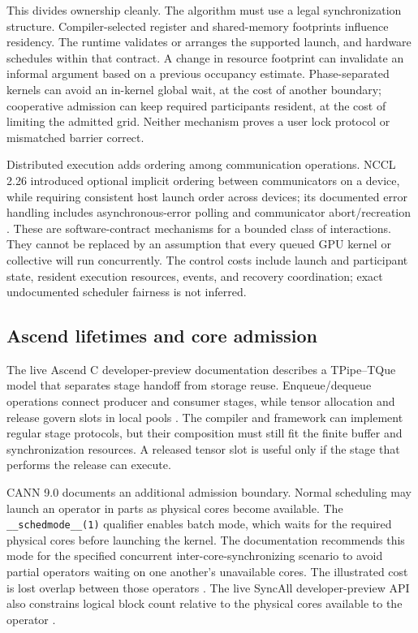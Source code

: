 This divides ownership cleanly. The algorithm must use a legal synchronization structure. Compiler-selected register and shared-memory footprints influence residency. The runtime validates or arranges the supported launch, and hardware schedules within that contract. A change in resource footprint can invalidate an informal argument based on a previous occupancy estimate. Phase-separated kernels can avoid an in-kernel global wait, at the cost of another boundary; cooperative admission can keep required participants resident, at the cost of limiting the admitted grid. Neither mechanism proves a user lock protocol or mismatched barrier correct.

Distributed execution adds ordering among communication operations. NCCL 2.26 introduced optional implicit ordering between communicators on a device, while requiring consistent host launch order across devices; its documented error handling includes asynchronous-error polling and communicator abort/recreation \citep{u008_nccl}. These are software-contract mechanisms for a bounded class of interactions. They cannot be replaced by an assumption that every queued GPU kernel or collective will run concurrently. The control costs include launch and participant state, resident execution resources, events, and recovery coordination; exact undocumented scheduler fairness is not inferred.

\subsection{Ascend lifetimes and core admission}

The live Ascend C developer-preview documentation describes a TPipe--TQue model that separates stage handoff from storage reuse. Enqueue/dequeue operations connect producer and consumer stages, while tensor allocation and release govern slots in local pools \citep{u008_ascend_tque}. The compiler and framework can implement regular stage protocols, but their composition must still fit the finite buffer and synchronization resources. A released tensor slot is useful only if the stage that performs the release can execute.

CANN 9.0 documents an additional admission boundary. Normal scheduling may launch an operator in parts as physical cores become available. The \texttt{\_\_schedmode\_\_(1)} qualifier enables batch mode, which waits for the required physical cores before launching the kernel. The documentation recommends this mode for the specified concurrent inter-core-synchronizing scenario to avoid partial operators waiting on one another's unavailable cores. The illustrated cost is lost overlap between those operators \citep{u008_ascend_batch}. The live SyncAll developer-preview API also constrains logical block count relative to the physical cores available to the operator \citep{u008_ascend_syncall}.

